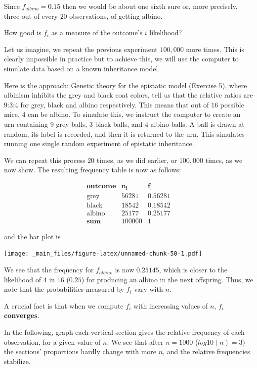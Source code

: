 \documentclass[
]{book}
\begin{document}
Since \(f_{albino}=0.15\) then we would be about one sixth sure or, more precisely, three out of every \(20\) observations, of getting albino.

How good is \(f_i\) as a measure of the outcome's \(i\) likelihood?

Let us imagine, we repeat the previous experiment \(100,000\) more times. This is clearly impossible in practice but to achieve this, we will use the computer to simulate data based on a known inheritance model.

Here is the approach: Genetic theory for the epistatic model (Exercise 5), where albinism inhibits the grey and black coat colors, tell us that the relative ratios are 9:3:4 for grey, black and albino respectively. This means that out of \(16\) possible mice, \(4\) can be albino. To simulate this, we instruct the computer to create an urn containing \(9\) grey balls, \(3\) black balls, and \(4\) albino balls. A ball is drawn at random, its label is recorded, and then it is returned to the urn. This simulates running one single random experiment of epistatic inheritance.

We can repeat this process \(20\) times, as we did earlier, or \(100,000\) times, as we now show. The resulting frequency table is now as follows:

\[
\begin{array}{ccc}
\mathbf{outcome}   & \mathbf{n_i} & \mathbf{f_i} \\
\text{grey}  & 56281    & 0.56281  \\
\text{black}   & 18542    & 0.18542  \\ 
\text{albino}  & 25177    & 0.25177  \\
\hline
\mathbf{sum} & 100000 & 1
\end{array}
\]

and the bar plot is

\texttt{[image: \_main\_files/figure-latex/unnamed-chunk-50-1.pdf]}

We see that the frequency for \(f_{albino}\) is now \(0.25145\), which is closer to the likelihood of \(4\) in \(16\) (\(0.25\)) for producing an albino in the next offspring. Thus, we note that the probabilities measured by \(f_i\) vary with \(n\).

A crucial fact is that when we compute \(f_i\) with increasing values of \(n\), \(f_i\) \textbf{converges}.

In the following, graph each vertical section gives the relative frequency of each observation, for a given value of \(n\). We see that after \(n=1000\) (\(log10(n)=3\)) the sections' proportions hardly change with more \(n\), and the relative frequencies stabilize.
\end{document}
